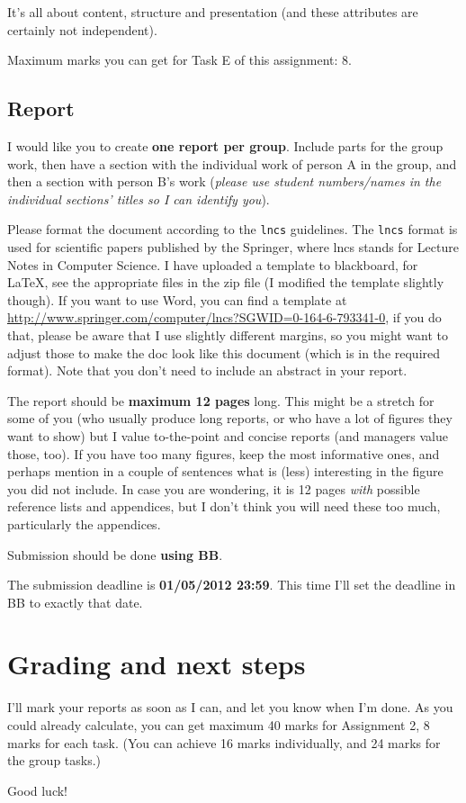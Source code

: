 \documentclass{llncs}
\begin{document}
It's all about content, structure and presentation (and these attributes are certainly not independent).

Maximum marks you can get for Task E of this assignment: 8.

\subsection{Report}
I would like you to create \textbf{one report per group}. Include parts for the group work, then have a section with the individual work of person A in the group, and then a section with person B's work (\textit{please use student numbers/names in the individual sections' titles so I can identify you}).

Please format the document according to the \texttt{lncs} guidelines. The \texttt{lncs} format is used for scientific papers published by the Springer, where lncs stands for Lecture Notes in Computer Science. I have uploaded a template to blackboard, for \LaTeX, see the appropriate files in the zip file (I modified the template slightly though). If you want to use Word, you can find a template at \href{http://www.springer.com/computer/lncs?SGWID=0-164-6-793341-0}{http://www.springer.com/computer/lncs?SGWID=0-164-6-793341-0}, if you do that, please be aware that I use slightly different margins, so you might want to adjust those to make the doc look like this document (which is in the required format). Note that you don't need to include an abstract in your report. 

The report should be \textbf{maximum 12 pages} long. This might be a stretch for some of you (who usually produce long reports, or who have a lot of figures they want to show) but I value to-the-point and concise reports (and managers value those, too). If you have too many figures, keep the most informative ones, and perhaps mention in a couple of sentences what is (less) interesting in the figure you did not include. In case you are wondering, it is 12 pages \textit{with} possible reference lists and appendices, but I don't think you will need these too much, particularly the appendices.

Submission should be done \textbf{using BB}.

The submission deadline is \textbf{01/05/2012 23:59}. This time I'll set the deadline in BB to exactly that date.

\section{Grading and next steps}
I'll mark your reports as soon as I can, and let you know when I'm done. As you could already calculate, you can get maximum 40 marks for Assignment 2, 8 marks for each task. (You can achieve 16 marks individually, and 24 marks for the group tasks.)

Good luck!

%
\end{document}
